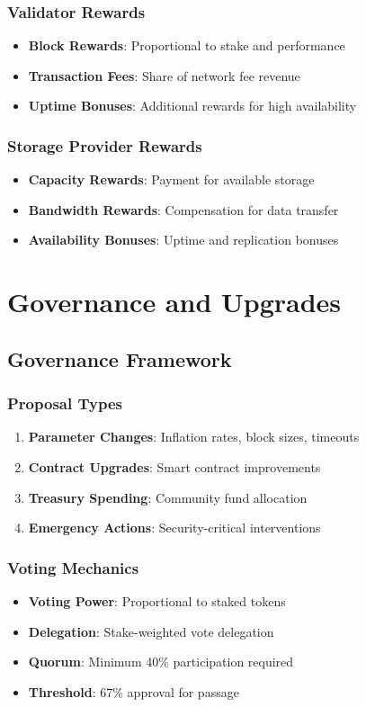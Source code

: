 \documentclass[11pt,a4paper]{article}
\begin{document}
\subsubsection{Validator Rewards}
\begin{itemize}
  \item \textbf{Block Rewards}: Proportional to stake and performance
  \item \textbf{Transaction Fees}: Share of network fee revenue
  \item \textbf{Uptime Bonuses}: Additional rewards for high availability
\end{itemize}

\subsubsection{Storage Provider Rewards}
\begin{itemize}
  \item \textbf{Capacity Rewards}: Payment for available storage
  \item \textbf{Bandwidth Rewards}: Compensation for data transfer
  \item \textbf{Availability Bonuses}: Uptime and replication bonuses
\end{itemize}

\section{Governance and Upgrades}

\subsection{Governance Framework}

\subsubsection{Proposal Types}
\begin{enumerate}
  \item \textbf{Parameter Changes}: Inflation rates, block sizes, timeouts
  \item \textbf{Contract Upgrades}: Smart contract improvements
  \item \textbf{Treasury Spending}: Community fund allocation
  \item \textbf{Emergency Actions}: Security-critical interventions
\end{enumerate}

\subsubsection{Voting Mechanics}
\begin{itemize}
  \item \textbf{Voting Power}: Proportional to staked tokens
  \item \textbf{Delegation}: Stake-weighted vote delegation
  \item \textbf{Quorum}: Minimum 40\% participation required
  \item \textbf{Threshold}: 67\% approval for passage
\end{itemize}
\end{document}
